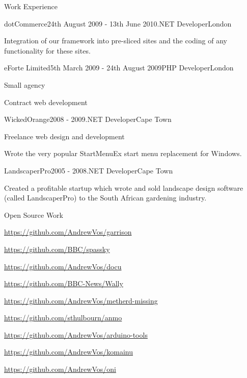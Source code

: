 \documentclass{resume}
\begin{document}
\begin{rSection}{Work Experience}
    \begin{rSubsection}{dotCommerce}{24th August 2009 - 13th June 2010}{.NET Developer}{London}
      \item Integration of our framework into pre-sliced sites and the coding of any functionality for these sites.
    \end{rSubsection}

    \begin{rSubsection}{eForte Limited}{5th March 2009 - 24th August 2009}{PHP Developer}{London}
      \item Small agency
      \item Contract web development
    \end{rSubsection}

    \begin{rSubsection}{WickedOrange}{2008 - 2009}{.NET Developer}{Cape Town}
      \item Freelance web design and development
      \item Wrote the very popular StartMenuEx start menu replacement for Windows.
    \end{rSubsection}

    \begin{rSubsection}{LandscaperPro}{2005 - 2008}{.NET Developer}{Cape Town}
      \item Created a profitable startup which wrote and sold landscape design software (called LandscaperPro) to the South African gardening industry.
    \end{rSubsection}
  \end{rSection}

  \begin{rSection}{Open Source Work}
    \item \url{https://github.com/AndrewVos/garrison}
    \item \url{https://github.com/BBC/spassky}
    \item \url{https://github.com/AndrewVos/docu}
    \item \url{https://github.com/BBC-News/Wally}
    \item \url{https://github.com/AndrewVos/metherd-missing}
    \item \url{https://github.com/sthulbourn/anmo}
    \item \url{https://github.com/AndrewVos/arduino-tools}
    \item \url{https://github.com/AndrewVos/komainu}
    \item \url{https://github.com/AndrewVos/oni}
  \end{rSection}
\end{document}
